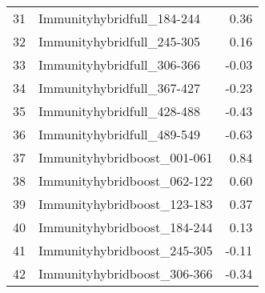 \begin{table}[ht]
\begin{tabular}{rlr}
  31 & Immunityhybridfull\_184-244 & 0.36 \\ 
  32 & Immunityhybridfull\_245-305 & 0.16 \\ 
  33 & Immunityhybridfull\_306-366 & -0.03 \\ 
  34 & Immunityhybridfull\_367-427 & -0.23 \\ 
  35 & Immunityhybridfull\_428-488 & -0.43 \\ 
  36 & Immunityhybridfull\_489-549 & -0.63 \\ 
  37 & Immunityhybridboost\_001-061 & 0.84 \\ 
  38 & Immunityhybridboost\_062-122 & 0.60 \\ 
  39 & Immunityhybridboost\_123-183 & 0.37 \\ 
  40 & Immunityhybridboost\_184-244 & 0.13 \\ 
  41 & Immunityhybridboost\_245-305 & -0.11 \\ 
  42 & Immunityhybridboost\_306-366 & -0.34 \\ 
   \hline
\end{tabular}
\end{table}
